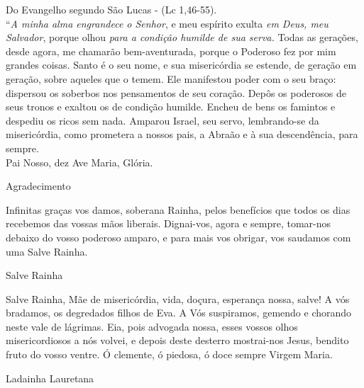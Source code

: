 \documentclass{book}
\begin{document}
\begin{flushleft}
    Do Evangelho segundo São Lucas - (\textcolor{VioletRed2}{Lc 1,46-55}). \\
    \hfill{} \break{}
    ``\textit{A minha alma engrandece o Senhor}, e meu espírito exulta \textit{em Deus, meu Salvador}, porque olhou \textit{para a condição humilde de sua serva.} Todas as gerações, desde agora, me chamarão bem-aventurada, porque o Poderoso fez por mim grandes coisas. Santo é o seu nome, e sua misericórdia se estende, de geração em geração, sobre aqueles que o temem. Ele manifestou poder com o seu braço: dispersou os soberbos nos pensamentos de seu coração. Depôs os poderosos de seus tronos e exaltou os de condição humilde. Encheu de bens os famintos e despediu os ricos sem nada. Amparou Israel, seu servo, lembrando-se da misericórdia, como prometera a nossos pais, a Abraão e à sua descendência, para sempre. \\
    \hfill{} \break{}
    Pai Nosso, dez Ave Maria, Glória.
\end{flushleft}
\begin{center}
    Agradecimento
\end{center}
\begin{flushleft}
    Infinitas graças vos damos, soberana Rainha, pelos benefícios que todos os dias recebemos das vossas mãos liberais. Dignai-vos, agora e sempre, tomar-nos debaixo do vosso poderoso amparo, e para mais vos obrigar, vos saudamos com uma Salve Rainha.
\end{flushleft}
\begin{center}
    Salve Rainha
\end{center}
\begin{flushleft}
    Salve Rainha, Mãe de misericórdia, vida, doçura, esperança nossa, salve! A vós bradamos, os degredados filhos de Eva. A Vós suspiramos, gemendo e chorando neste vale de lágrimas. Eia, pois advogada nossa, esses vossos olhos misericordiosos a nós volvei, e depois deste desterro mostrai-nos Jesus, bendito fruto do vosso ventre. Ó clemente, ó piedosa, ó doce sempre Virgem Maria.
\end{flushleft}
\newpage
\begin{center}
    Ladainha Lauretana
\end{center}
\end{document}
